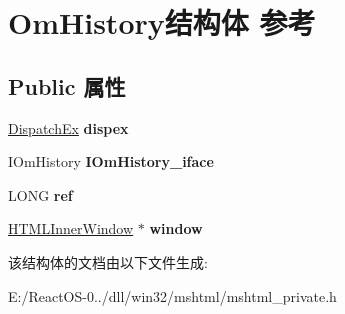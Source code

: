 \hypertarget{struct_om_history}{}\section{Om\+History结构体 参考}
\label{struct_om_history}
\subsection*{Public 属性}
\begin{DoxyCompactItemize}
\item 
\mbox{\label{struct_om_history_af9a4cc440491faa9e05601f5adef98f4}} 
\hyperlink{struct_dispatch_ex}{Dispatch\+Ex} {\bfseries dispex}
\item 
\mbox{\label{struct_om_history_ab820a3a727488db1ceb45679d9512a45}} 
I\+Om\+History {\bfseries I\+Om\+History\+\_\+iface}
\item 
\mbox{\label{struct_om_history_aee862042546c89705bc4dd37b90fe274}} 
L\+O\+NG {\bfseries ref}
\item 
\mbox{\label{struct_om_history_ada6397bcca1aa98753d70baba02f81ec}} 
\hyperlink{struct_h_t_m_l_inner_window}{H\+T\+M\+L\+Inner\+Window} $\ast$ {\bfseries window}
\end{DoxyCompactItemize}


该结构体的文档由以下文件生成\+:\begin{DoxyCompactItemize}
\item 
E\+:/\+React\+O\+S-\/0../dll/win32/mshtml/mshtml\+\_\+private.\+h\end{DoxyCompactItemize}

